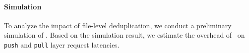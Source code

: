 \paragraph{Simulation}
%
%
To analyze the impact of file-level deduplication, we conduct a preliminary simulation of
\sysname.
%
Based on the simulation result, we estimate the overhead of \sysname\ on
\texttt{push} and \texttt{pull} layer request latencies.
%
%
%

%
%
%
%
%
%
%
%
%

% 

